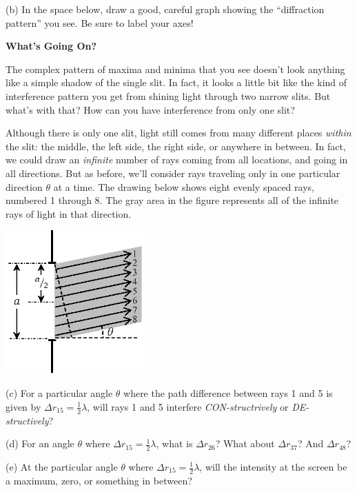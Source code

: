 (b) In the space below, draw a good, careful graph showing the ``diffraction pattern'' you see.  
Be sure to label your axes!
\answerspace{1.5in}

\pagebreak[2]
\textbf{What's Going On?}

The complex pattern of maxima and minima that you see doesn't look anything like a simple shadow of the single slit.  In fact, it looks a little bit like the kind of interference pattern you get from shining light through two narrow slits.  But what's with that?  How can you have interference from only one slit?

Although there is only one slit, light still comes from many different places \textit{within} the slit: the middle, the left side, the right side, or anywhere in between.  In fact, we could draw an \textit{infinite} number of rays coming from all locations, and going in all directions.  But as before, we'll consider rays traveling only in one particular direction $\theta$ at a time.  The drawing below shows eight evenly spaced rays, numbered 1 through 8.  The gray area in the figure represents all of the infinite rays of light in that direction.

\answerspace{0.2in}
\begin{center}
\includegraphics[width=0.4\textwidth]{diffraction_of_light/one_slit.eps}
\end{center}
\answerspace{0.2in}

(c) For a particular angle $\theta$ where the path difference between rays 1 and 5 is given by $\Delta r_{15}=\frac{1}{2}\lambda$, will rays 1 and 5 interfere \textit{CON-structrively} or \textit{DE-structively}?
\answerspace{0.4in}

(d) For an angle $\theta$ where $\Delta r_{15}=\frac{1}{2}\lambda$, what is $\Delta r_{26}$?  What about $\Delta r_{37}$? And $\Delta r_{48}$?
\answerspace{0.5in}

(e) At the particular angle $\theta$ where $\Delta r_{15}=\frac{1}{2}\lambda$, will the intensity at the screen be a maximum, zero, or something in between?
\answerspace{0.4in}

